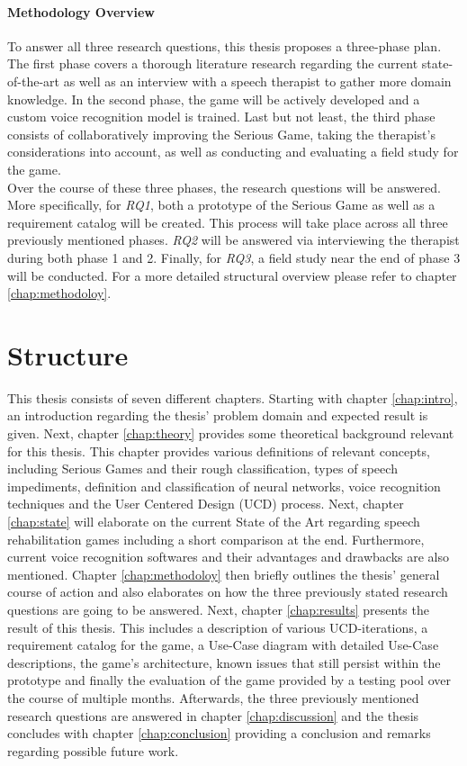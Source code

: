 \documentclass[draft,final]{vutinfth} %
\begin{document}
\paragraph{Methodology Overview} To answer all three research questions, this thesis proposes a three-phase plan. The first phase covers a thorough literature research regarding the current state-of-the-art as well as an interview with a speech therapist to gather more domain knowledge. In the second phase, the game will be actively developed and a custom voice recognition model is trained. Last but not least, the third phase consists of collaboratively improving the Serious Game, taking the therapist's considerations into account, as well as conducting and evaluating a field study for the game. \\
Over the course of these three phases, the research questions will be answered. More specifically, for \emph{RQ1}, both a prototype of the Serious Game as well as a requirement catalog will be created. This process will take place across all three previously mentioned phases. \emph{RQ2} will be answered via interviewing the therapist during both phase 1 and 2. Finally, for \emph{RQ3}, a field study near the end of phase 3 will be conducted. For a more detailed structural overview please refer to chapter \ref{chap:methodoloy}.

\section{Structure}
This thesis consists of seven different chapters. Starting with chapter \ref{chap:intro}, an introduction regarding the thesis' problem domain and expected result is given. Next, chapter \ref{chap:theory} provides some theoretical background relevant for this thesis. This chapter provides various definitions of relevant concepts, including Serious Games and their rough classification, types of speech impediments, definition and classification of neural networks, voice recognition techniques and the User Centered Design (UCD) process. Next, chapter \ref{chap:state} will elaborate on the current State of the Art regarding speech rehabilitation games including a short comparison at the end. Furthermore, current voice recognition softwares and their advantages and drawbacks are also mentioned. Chapter \ref{chap:methodoloy} then briefly outlines the thesis' general course of action and also elaborates on how the three previously stated research questions are going to be answered. Next, chapter \ref{chap:results} presents the result of this thesis. This includes a description of various UCD-iterations, a requirement catalog for the game, a Use-Case diagram with detailed Use-Case descriptions, the game's architecture, known issues that still persist within the prototype and finally the evaluation of the game provided by a testing pool over the course of multiple months. Afterwards, the three previously mentioned research questions are answered in chapter \ref{chap:discussion} and the thesis concludes with chapter \ref{chap:conclusion} providing a conclusion and remarks regarding possible future work.
\end{document}
